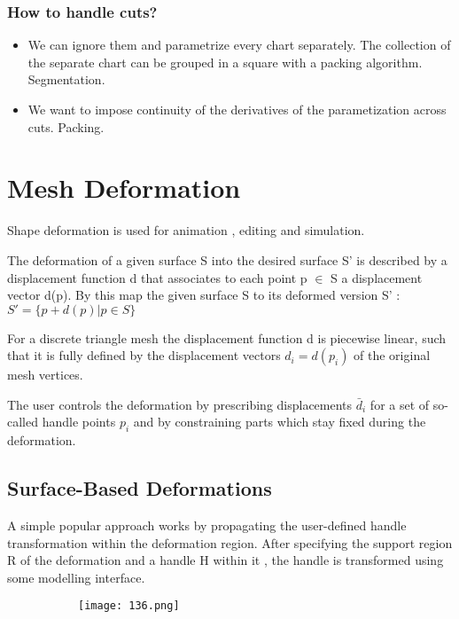 \documentclass{article}
\begin{document}
\subsubsection{How to handle cuts?}

\begin{itemize}
    \item We can ignore them and parametrize every chart separately. The collection of the separate chart can be grouped in a square with a packing algorithm. Segmentation.
    \item We want to impose continuity of the derivatives of the parametization across cuts. Packing.
\end{itemize}

\section{Mesh Deformation}

Shape deformation is used for animation , editing and simulation.

The deformation of a given surface S into the desired surface S' is described by a displacement function d that associates to each point p $\in$ S a displacement vector d(p). By this map the given surface S to its deformed version S' : $S' = \{ p + d(p) | p \in S \}$

For a discrete triangle mesh the displacement function d is piecewise linear, such that it is fully defined by the displacement vectors $d_i = d(p_i)$ of the original mesh vertices.

The user controls the deformation by prescribing displacements $\bar d_i$ for a set of so-called handle points $p_i$ and by constraining parts which stay fixed during the deformation.

\subsection{Surface-Based Deformations}

A simple popular approach works by propagating the user-defined handle transformation within the deformation region. After specifying the support region R of the deformation and a handle H within it , the handle is transformed using some modelling interface.

    \begin{figure}[ht!]
  \centering
  \begin{subfigure}[b]{0.7\linewidth}
    \texttt{[image: 136.png]}
  \end{subfigure}
\end{figure}
\end{document}
